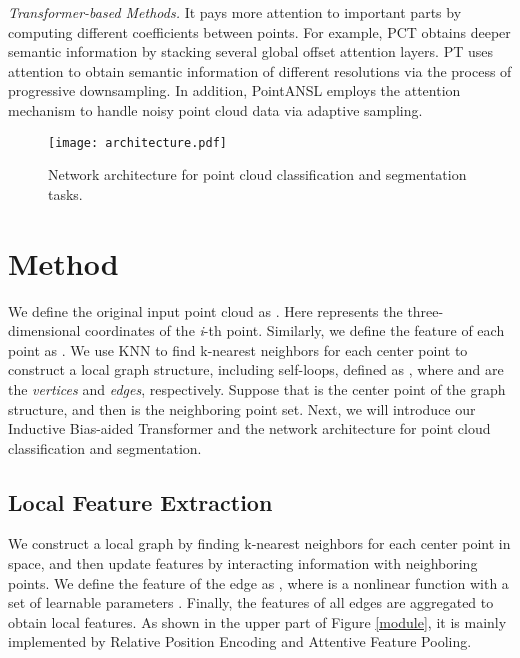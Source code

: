 \documentclass[conference]{IEEEtran}
\begin{document}
\emph{Transformer-based Methods.} It pays more attention to important parts by computing different coefficients between points. For example, PCT \cite{guo2021pct} obtains deeper semantic information by stacking several global offset attention layers. PT \cite{zhao2021point} uses attention to obtain semantic information of different resolutions via the process of progressive downsampling. In addition, PointANSL \cite{yan2020pointasnl} employs the attention mechanism to handle noisy point cloud data via adaptive sampling.

\begin{figure*}[h]
    \centering
   \texttt{[image: architecture.pdf]}
   \vspace{-5pt}
   \caption{Network architecture for point cloud classification and segmentation tasks.}
\label{architecture}
   \vspace{-8pt}
\end{figure*}

\vspace{-0.3cm}

\section{Method}
 We define the original input point cloud as  . Here  represents the three-dimensional coordinates  of the {\emph i}-th point. Similarly, we define the feature of each point as  . We use KNN to find k-nearest neighbors for each center point to construct a local graph structure, including self-loops, defined as , where  and  are the {\em vertices} and {\em edges}, respectively. Suppose that  is the center point of the graph structure, and then  is the neighboring point set. Next, we will introduce our Inductive Bias-aided Transformer and the network architecture for point cloud classification and segmentation.
\subsection{Local Feature Extraction}
We construct a local graph by finding k-nearest neighbors for each center point in space, and then update features by interacting information with neighboring points. We define the feature of the edge as  , where  is a nonlinear function with a set of learnable parameters . Finally, the features of all edges are aggregated to obtain local features. As shown in the upper part of Figure \ref{module}, it is mainly implemented by Relative Position Encoding and Attentive Feature Pooling.
\end{document}
